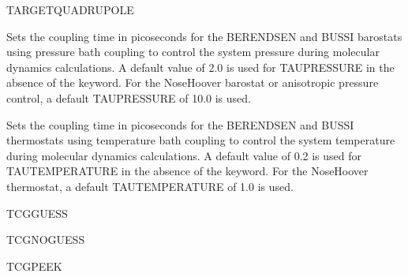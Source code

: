 \documentclass[letterpaper,11pt,english]{sphinxmanual}
\begin{document}
\ignorespaces {}\label{\detokenize{text/keywords:key-target-quadrupole}}
\sphinxAtStartPar
TARGET\sphinxhyphen{}QUADRUPOLE

\ignorespaces {}\label{\detokenize{text/keywords:key-tau-pressure}}\begin{description}
\sphinxAtStartPar
Sets the coupling time in picoseconds for the BERENDSEN and BUSSI barostats using pressure bath coupling to control the system pressure during molecular dynamics calculations. A default value of 2.0 is used for TAU\sphinxhyphen{}PRESSURE in the absence of the keyword. For the Nose\sphinxhyphen{}Hoover barostat or anisotropic pressure control, a default TAU\sphinxhyphen{}PRESSURE of 10.0 is used.

\end{description}

\ignorespaces {}\label{\detokenize{text/keywords:key-tau-temperature}}\begin{description}
\sphinxAtStartPar
Sets the coupling time in picoseconds for the BERENDSEN and BUSSI thermostats using temperature bath coupling to control the system temperature during molecular dynamics calculations. A default value of 0.2 is used for TAU\sphinxhyphen{}TEMPERATURE in the absence of the keyword. For the Nose\sphinxhyphen{}Hoover thermostat, a default TAU\sphinxhyphen{}TEMPERATURE of 1.0 is used.

\end{description}

\ignorespaces {}\label{\detokenize{text/keywords:key-tcg-guess}}
\sphinxAtStartPar
TCG\sphinxhyphen{}GUESS

\ignorespaces {}\label{\detokenize{text/keywords:key-tcg-noguess}}
\sphinxAtStartPar
TCG\sphinxhyphen{}NOGUESS

\ignorespaces {}\label{\detokenize{text/keywords:key-tcg-peek}}
\sphinxAtStartPar
TCG\sphinxhyphen{}PEEK
\end{document}
